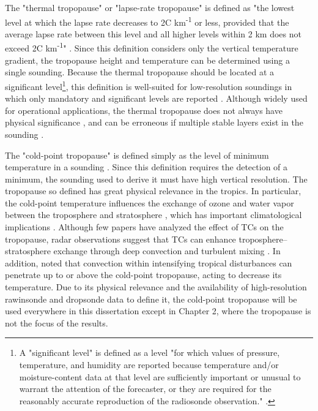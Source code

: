 The "thermal tropopause" or "lapse-rate tropopause" is defined as "the lowest level at which the lapse rate decreases to 2\textdegree{}C km\textsuperscript{-1} or less, provided that the average lapse rate between this level and all higher levels within 2 km does not exceed 2\textdegree{}C km\textsuperscript{-1}" \citep{WMO1957}.
Since this definition considers only the vertical temperature gradient, the tropopause height and temperature can be determined using a single sounding.
Because the thermal tropopause should be located at a significant level\footnote{A "significant level" is defined as a level "for which values of pressure, temperature, and humidity are reported because temperature and/or moisture-content data at that level are sufficiently important or unusual to warrant the attention of the forecaster, or they are required for the reasonably accurate reproduction of the radiosonde observation." \citep{AMSglossary}.}, this definition is well-suited for low-resolution soundings in which only mandatory and significant levels are reported \citep{YuchechenandCanziani}.
Although widely used for operational applications, the thermal tropopause does not always have physical significance \citep{HighwoodHoskins1998}, and can be erroneous if multiple stable layers exist in the sounding \citep{Hoerlingetal1991}.

The "cold-point tropopause" is defined simply as the level of minimum temperature in a sounding \citep{HighwoodHoskins1998}.
Since this definition requires the detection of a minimum, the sounding used to derive it must have high vertical resolution.
The tropopause so defined has great physical relevance in the tropics.
In particular, the cold-point temperature influences the exchange of ozone and water vapor between the troposphere and stratosphere \citep{Moteetal1996}, which has important climatological implications \citep{Holtonetal1995}.
Although few papers have analyzed the effect of TCs on the tropopause, radar observations suggest that TCs can enhance troposphere--stratosphere exchange through deep convection and turbulent mixing \citep{Dasetal2008}.
In addition, \citep{Davisetal2014} noted that convection within intensifying tropical disturbances can penetrate up to or above the cold-point tropopause, acting to decrease its temperature.
Due to its physical relevance and the availability of high-resolution rawinsonde and dropsonde data to define it, the cold-point tropopause will be used everywhere in this dissertation except in Chapter 2, where the tropopause is not the focus of the results.


